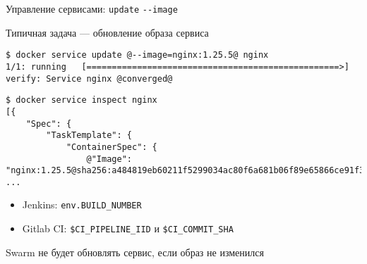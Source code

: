 \begin{frame}[fragile]{Управление сервисами: \texttt{update} \texttt{-{}-image} }

Типичная задача --- обновление образа сервиса

\begin{tcolorbox-code}
\begin{lstlisting}[style=base]
$ docker service update @--image=nginx:1.25.5@ nginx
1/1: running   [==================================================>] 
verify: Service nginx @converged@
\end{lstlisting}
\end{tcolorbox-code}

\begin{tcolorbox-code}
\begin{lstlisting}[style=base]
$ docker service inspect nginx
[{      
    "Spec": {
        "TaskTemplate": {
            "ContainerSpec": {
                @"Image": "nginx:1.25.5@sha256:a484819eb60211f5299034ac80f6a681b06f89e65866ce91f356ed7c72af059c"@,
...
    \end{lstlisting}
\end{tcolorbox-code}

\begin{itemize}
    \item Jenkins: \texttt{env.BUILD\_NUMBER}
    \item Gitlab CI: \texttt{\$CI\_PIPELINE\_IID} и \texttt{\$CI\_COMMIT\_SHA}
\end{itemize}

Swarm {\color{bad} не будет обновлять сервис}, если образ не изменился

\end{frame}
